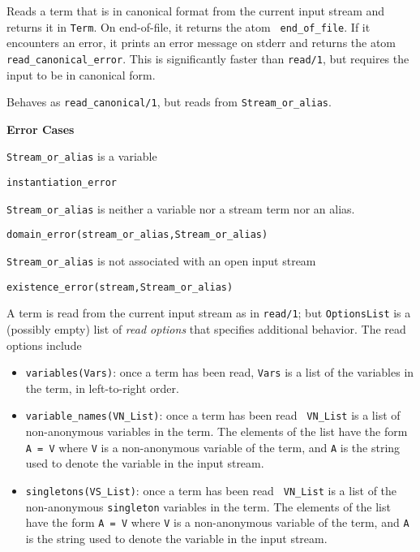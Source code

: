 \begin{description}
Reads a term that is in canonical format from the current input stream
and returns it in {\tt Term}. On end-of-file, it returns the atom {\tt
end\_of\_file}.  If it encounters an error, it prints an error message
on stderr and returns the atom {\tt read\_canonical\_error}. This is
significantly faster than {\tt read/1}, but requires the input to be
in canonical form.


Behaves as {\tt read\_canonical/1}, but reads from {\tt Stream\_or\_alias}.

{\bf Error Cases}
\bi
\item 	{\tt Stream\_or\_alias} is a variable
\bi
\item {\tt instantiation\_error}
\ei
\item 	{\tt Stream\_or\_alias} is neither a variable nor a stream term nor an alias.
\bi
\item 	{\tt domain\_error(stream\_or\_alias,Stream\_or\_alias)}
\ei
\item 	{\tt Stream\_or\_alias} is not associated with an open input stream
\bi
\item 	{\tt existence\_error(stream,Stream\_or\_alias)}
\ei
\ei

%
A term is read from the current input stream as in {\tt read/1}; but
{\tt OptionsList} is a (possibly empty) list of {\em read options}
that specifies additional behavior.  The read options include
\begin{itemize}
\item {\tt variables(Vars)}: once a term has been read, {\tt Vars} is a
list of the variables in the term, in left-to-right order. 
\item {\tt variable\_names(VN\_List)}: once a term has been read {\tt
VN\_List} is a list of non-anonymous variables in the term.  The
elements of the list have the form {\tt A = V} where {\tt V} is a
non-anonymous variable of the term, and {\tt A} is the string used to
denote the variable in the input stream.
\item {\tt singletons(VS\_List)}: once a term has been read {\tt
VN\_List} is a list of the non-anonymous {\tt singleton} variables in
the term.  The elements of the list have the form {\tt A = V} where
{\tt V} is a non-anonymous variable of the term, and {\tt A} is the
string used to denote the variable in the input stream.
\end{itemize}


\end{description}
